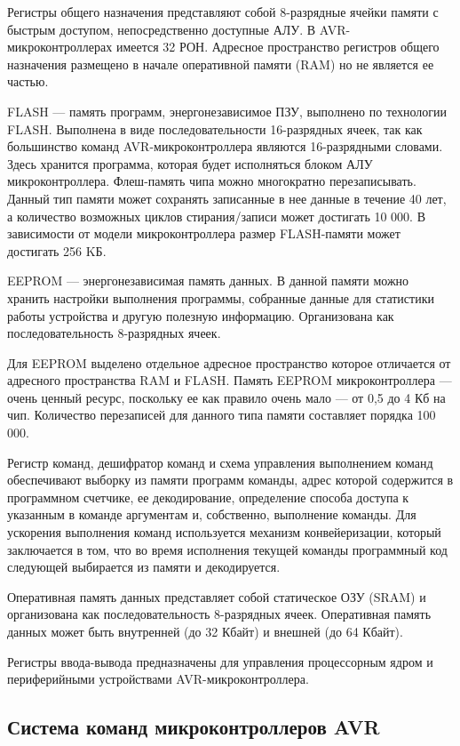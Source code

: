 \documentclass[12pt, oneside]{altsu-report}
\begin{document}
Регистры общего назначения представляют собой 8-разрядные ячейки памяти с быстрым доступом, непосредственно доступные АЛУ. В AVR-микроконтроллерах имеется 32 РОН. Адресное пространство регистров общего назначения размещено в начале оперативной памяти (RAM) но не является ее частью.

FLASH --- память программ, энергонезависимое ПЗУ, выполнено по технологии FLASH. Выполнена в виде последовательности 16-разрядных ячеек, так как большинство команд AVR-микроконтроллера являются 16-разрядными словами. Здесь хранится программа, которая будет исполняться блоком АЛУ микроконтроллера. Флеш-память чипа можно многократно перезаписывать. Данный тип памяти может сохранять записанные в нее данные в течение 40 лет, а количество возможных циклов стирания/записи может достигать 10 000. В зависимости от модели микроконтроллера размер FLASH-памяти может достигать 256 KБ.

EEPROM --- энергонезависимая память данных. В данной памяти можно хранить настройки выполнения программы, собранные данные для статистики работы устройства и другую полезную информацию. Организована как последовательность 8-разрядных ячеек.

Для EEPROM выделено отдельное адресное пространство которое отличается от адресного пространства RAM и FLASH. Память EEPROM микроконтроллера --- очень ценный ресурс, поскольку ее как правило очень мало --- от 0,5 до 4 Кб на чип. Количество перезаписей для данного типа памяти составляет порядка 100 000.

Регистр команд, дешифратор команд и схема управления выполнением команд обеспечивают выборку из памяти программ команды, адрес которой содержится в программном счетчике, ее декодирование, определение способа доступа к указанным в команде аргументам и, собственно, выполнение команды. Для ускорения выполнения команд используется механизм конвейеризации, который заключается в том, что во время исполнения текущей команды программный код следующей выбирается из памяти и декодируется.

Оперативная память данных представляет собой статическое ОЗУ (SRAM) и организована как последовательность 8-разрядных ячеек. Оперативная память данных может быть внутренней (до 32 Кбайт) и внешней (до 64 Кбайт).

Регистры ввода-вывода предназначены для управления процессорным ядром и периферийными устройствами AVR-микроконтроллера.

\subsection{Система команд микроконтроллеров AVR}
\end{document}
